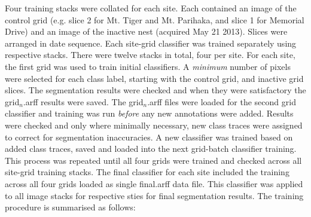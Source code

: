 Four training stacks were collated for each site. Each contained an image of the control grid (e.g. slice 2 for Mt. Tiger and Mt. Parihaka, and slice 1 for Memorial Drive) and an image of the inactive nest (acquired May 21 2013). Slices were arranged in date sequence. Each site-grid classifier was trained separately using respective stacks. There were twelve stacks in total, four per site. For each site, the first grid was used to train initial classifiers. A \emph{minimum} number of pixels were selected for each class label, starting with the control grid, and inactive grid slices. The segmentation results were checked and when they were satisfactory the grid$_{n}$.arff results were saved. The grid$_{n}$.arff files were loaded for the second grid classifier and training was run \emph{before} any new annotations were added. Results were checked and only where minimally necessary, new class traces were assigned to correct for segmentation inaccuracies. A new classifier was trained based on added class traces, saved and loaded into the next grid-batch classifier training. This process was repeated until all four grids were trained and checked across all site-grid training stacks. The final classifier for each site included the training across all four grids loaded as single final.arff data file. This classifier was applied to all image stacks for respective sties for final segmentation results. The training procedure is summarised as follows:

